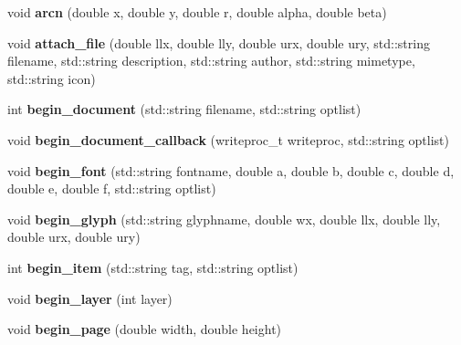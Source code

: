 \begin{DoxyCompactItemize}
\item 
\hypertarget{classPDFlib_a061eb6bb4e041c52547cf9d58416ddac}{void {\bfseries arcn} (double x, double y, double r, double alpha, double beta)}\label{classPDFlib_a061eb6bb4e041c52547cf9d58416ddac}

\item 
\hypertarget{classPDFlib_a911b3c91d2670200cdb3b78742fc6980}{void {\bfseries attach\-\_\-file} (double llx, double lly, double urx, double ury, std\-::string filename, std\-::string description, std\-::string author, std\-::string mimetype, std\-::string icon)}\label{classPDFlib_a911b3c91d2670200cdb3b78742fc6980}

\item 
\hypertarget{classPDFlib_aacb38db7f6eada3409fb616bd823e79f}{int {\bfseries begin\-\_\-document} (std\-::string filename, std\-::string optlist)}\label{classPDFlib_aacb38db7f6eada3409fb616bd823e79f}

\item 
\hypertarget{classPDFlib_a0c3289b502ca325c222c4df9c8318d1f}{void {\bfseries begin\-\_\-document\-\_\-callback} (writeproc\-\_\-t writeproc, std\-::string optlist)}\label{classPDFlib_a0c3289b502ca325c222c4df9c8318d1f}

\item 
\hypertarget{classPDFlib_a3f8a5ee80b6c632c1687e3100ef4a1bb}{void {\bfseries begin\-\_\-font} (std\-::string fontname, double a, double b, double c, double d, double e, double f, std\-::string optlist)}\label{classPDFlib_a3f8a5ee80b6c632c1687e3100ef4a1bb}

\item 
\hypertarget{classPDFlib_adeb917523298b8df07d5a0161dca81ca}{void {\bfseries begin\-\_\-glyph} (std\-::string glyphname, double wx, double llx, double lly, double urx, double ury)}\label{classPDFlib_adeb917523298b8df07d5a0161dca81ca}

\item 
\hypertarget{classPDFlib_a0df23d2d6f9a6a100878bad9b8936e6c}{int {\bfseries begin\-\_\-item} (std\-::string tag, std\-::string optlist)}\label{classPDFlib_a0df23d2d6f9a6a100878bad9b8936e6c}

\item 
\hypertarget{classPDFlib_ac35bac599211da4f97c13bf5d752ca4f}{void {\bfseries begin\-\_\-layer} (int layer)}\label{classPDFlib_ac35bac599211da4f97c13bf5d752ca4f}

\item 
\hypertarget{classPDFlib_a311dccd5a1ac04646673e6eaeea476ae}{void {\bfseries begin\-\_\-page} (double width, double height)}\label{classPDFlib_a311dccd5a1ac04646673e6eaeea476ae}


\end{DoxyCompactItemize}
